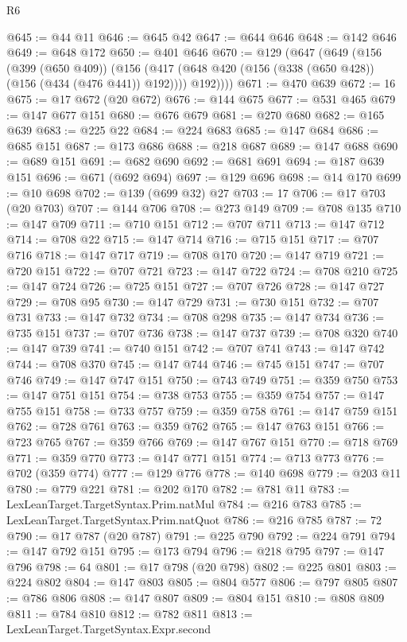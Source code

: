 \begin{lexlean}{R6}
\begin{coremodule}
@645 := @44 @11
@646 := @645 @42
@647 := @644 @646
@648 := @142 @646
@649 := @648 @172
@650 := @401 @646
@670 := @129
    (@647
      (@649
        (@156
          (@399 (@650 @409))
          (@156 (@417 (@648 @420 (@156 (@338 (@650 @428)) (@156 (@434 (@476 @441)) @192)))) @192))))
@671 := @470 @639
@672 := 16
@675 := @17 @672 (@20 @672)
@676 := @144 @675
@677 := @531 @465
@679 := @147 @677 @151
@680 := @676 @679
@681 := @270 @680
@682 := @165 @639
@683 := @225 @22
@684 := @224 @683
@685 := @147 @684
@686 := @685 @151
@687 := @173 @686
@688 := @218 @687
@689 := @147 @688
@690 := @689 @151
@691 := @682 @690
@692 := @681 @691
@694 := @187 @639 @151
@696 := @671 (@692 @694)
@697 := @129 @696
@698 := @14 @170
@699 := @10 @698
@702 := @139 (@699 @32) @27
@703 := 17
@706 := @17 @703 (@20 @703)
@707 := @144 @706
@708 := @273 @149
@709 := @708 @135
@710 := @147 @709
@711 := @710 @151
@712 := @707 @711
@713 := @147 @712
@714 := @708 @22
@715 := @147 @714
@716 := @715 @151
@717 := @707 @716
@718 := @147 @717
@719 := @708 @170
@720 := @147 @719
@721 := @720 @151
@722 := @707 @721
@723 := @147 @722
@724 := @708 @210
@725 := @147 @724
@726 := @725 @151
@727 := @707 @726
@728 := @147 @727
@729 := @708 @95
@730 := @147 @729
@731 := @730 @151
@732 := @707 @731
@733 := @147 @732
@734 := @708 @298
@735 := @147 @734
@736 := @735 @151
@737 := @707 @736
@738 := @147 @737
@739 := @708 @320
@740 := @147 @739
@741 := @740 @151
@742 := @707 @741
@743 := @147 @742
@744 := @708 @370
@745 := @147 @744
@746 := @745 @151
@747 := @707 @746
@749 := @147 @747 @151
@750 := @743 @749
@751 := @359 @750
@753 := @147 @751 @151
@754 := @738 @753
@755 := @359 @754
@757 := @147 @755 @151
@758 := @733 @757
@759 := @359 @758
@761 := @147 @759 @151
@762 := @728 @761
@763 := @359 @762
@765 := @147 @763 @151
@766 := @723 @765
@767 := @359 @766
@769 := @147 @767 @151
@770 := @718 @769
@771 := @359 @770
@773 := @147 @771 @151
@774 := @713 @773
@776 := @702 (@359 @774)
@777 := @129 @776
@778 := @140 @698
@779 := @203 @11
@780 := @779 @221
@781 := @202 @170
@782 := @781 @11
@783 := LexLeanTarget.TargetSyntax.Prim.natMul
@784 := @216 @783
@785 := LexLeanTarget.TargetSyntax.Prim.natQuot
@786 := @216 @785
@787 := 72
@790 := @17 @787 (@20 @787)
@791 := @225 @790
@792 := @224 @791
@794 := @147 @792 @151
@795 := @173 @794
@796 := @218 @795
@797 := @147 @796
@798 := 64
@801 := @17 @798 (@20 @798)
@802 := @225 @801
@803 := @224 @802
@804 := @147 @803
@805 := @804 @577
@806 := @797 @805
@807 := @786 @806
@808 := @147 @807
@809 := @804 @151
@810 := @808 @809
@811 := @784 @810
@812 := @782 @811
@813 := LexLeanTarget.TargetSyntax.Expr.second

\end{coremodule}
\end{lexlean}
